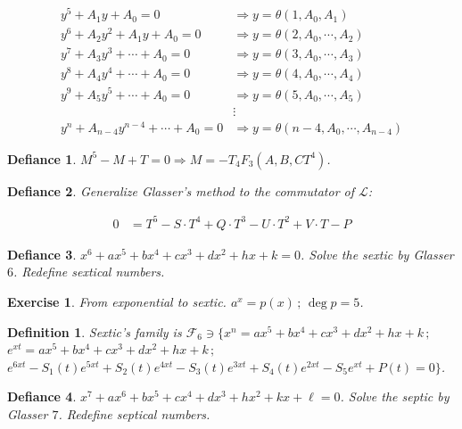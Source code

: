 \documentclass[12pt,a4paper]{article}
\newtheorem{exercise}{Exercise}[section]
\newtheorem{defy}{Defiance}
\newtheorem{definition}{Definition}[section]
\begin{document}
\begin{align}
  y^5 + A_1 y + A_0 = 0 &\Rightarrow y = \theta(1, A_0, A_1) \\
  y^6 + A_2 y^2 + A_1 y + A_0 = 0 &\Rightarrow y = \theta(2, A_0, \cdots, A_2) \\
  y^7 + A_3 y^3 + \cdots + A_0 = 0 &\Rightarrow y = \theta(3, A_0, \cdots, A_3) \\
  y^8 + A_4 y^4 + \cdots + A_0 = 0 &\Rightarrow y = \theta(4, A_0, \cdots, A_4) \\
  y^9 + A_5 y^5 + \cdots + A_0 = 0 &\Rightarrow y = \theta(5, A_0, \cdots, A_5) \\
  &\vdots \\
  y^n + A_{n - 4} y^{n - 4} + \cdots + A_0 = 0 &\Rightarrow y = \theta(n - 4, A_0, \cdots, A_{n - 4})
\end{align}

\begin{defy}
$M^5 - M + T = 0 \Rightarrow M = - T_4F_3(A, B, CT^4)$.
\end{defy}

\begin{defy}
Generalize Glasser's method to the commutator of $\mathcal{L}$:
\end{defy}

\begin{align}
  0 &= T^5 - S\cdot T^4 + Q\cdot T^3 - U\cdot T^2 + V\cdot T - P
\end{align}

\begin{defy}
$x^6 + ax^5 + bx^4 + cx^3 + dx^2 + hx + k = 0$.
Solve the sextic by Glasser $6$. Redefine sextical numbers.
\end{defy}

\begin{exercise}
From exponential to sextic. $a^x = p(x)\,;\,\deg p = 5$.
\end{exercise}

\begin{definition}
Sextic's family is $\mathcal{F}_6 \ni \{ x^n = ax^5 + bx^4 + cx^3 + dx^2 + hx + k\,;\,$ \\
$e^{xt} = ax^5 + bx^4 + cx^3 + dx^2 + hx + k\,;\,$ \\
$e^{6xt} - S_1(t) e^{5xt} + S_2(t) e^{4xt} - S_3(t) e^{3xt} + S_4(t) e^{2xt} - S_5 e^{xt} + P(t) = 0 \}$.
\end{definition}

\begin{defy}
$x^7 + ax^6 + bx^5 + cx^4 + dx^3 + hx^2 + kx + \ell = 0$.
Solve the septic by Glasser $7$. Redefine septical numbers.
\end{defy}
\end{document}
